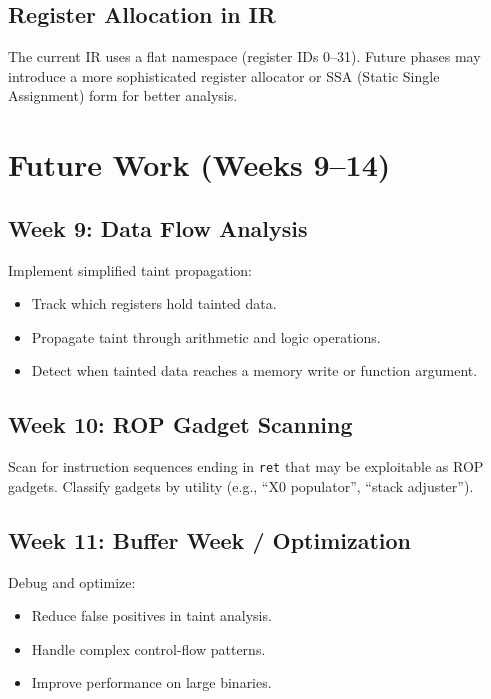 \documentclass[12pt,a4paper]{article}
\begin{document}
\subsection{Register Allocation in IR}

The current IR uses a flat namespace (register IDs 0--31). Future phases may introduce a more sophisticated register allocator or SSA (Static Single Assignment) form for better analysis.

\newpage

\section{Future Work (Weeks 9--14)}

\subsection{Week 9: Data Flow Analysis}

Implement simplified taint propagation:
\begin{itemize}
  \item Track which registers hold tainted data.
  \item Propagate taint through arithmetic and logic operations.
  \item Detect when tainted data reaches a memory write or function argument.
\end{itemize}

\subsection{Week 10: ROP Gadget Scanning}

Scan for instruction sequences ending in \texttt{ret} that may be exploitable as ROP gadgets. Classify gadgets by utility (e.g., ``X0 populator'', ``stack adjuster'').

\subsection{Week 11: Buffer Week / Optimization}

Debug and optimize:
\begin{itemize}
  \item Reduce false positives in taint analysis.
  \item Handle complex control-flow patterns.
  \item Improve performance on large binaries.
\end{itemize}
\end{document}
